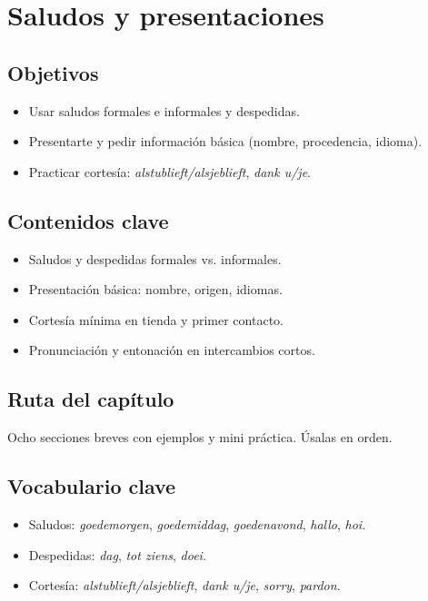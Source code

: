 \chapter{Saludos y presentaciones}
\section{Objetivos}
\begin{itemize}[leftmargin=*]
	\item Usar saludos formales e informales y despedidas.
	\item Presentarte y pedir información básica (nombre, procedencia, idioma).
	\item Practicar cortesía: \textit{alstublieft/alsjeblieft}, \textit{dank u/je}.
\end{itemize}

\section{Contenidos clave}
\begin{itemize}[leftmargin=*]
	\item Saludos y despedidas formales vs. informales.
	\item Presentación básica: nombre, origen, idiomas.
	\item Cortesía mínima en tienda y primer contacto.
	\item Pronunciación y entonación en intercambios cortos.
\end{itemize}

\section{Ruta del capítulo}
Ocho secciones breves con ejemplos y mini práctica. Úsalas en orden.










\section{Vocabulario clave}
\begin{itemize}[leftmargin=*]
	\item Saludos: \textit{goedemorgen}, \textit{goedemiddag}, \textit{goedenavond}, \textit{hallo}, \textit{hoi}.
	\item Despedidas: \textit{dag}, \textit{tot ziens}, \textit{doei}.
	\item Cortesía: \textit{alstublieft/alsjeblieft}, \textit{dank u/je}, \textit{sorry}, \textit{pardon}.
\end{itemize}

